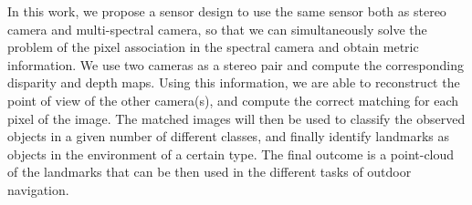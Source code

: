\documentclass[letterpaper, 10pt, conference]{ieeeconf}      %
\begin{document}
%
%
%



In this work, we propose a sensor design to use the same sensor both as stereo camera and multi-spectral camera, so that we can simultaneously solve the problem of the pixel association in the spectral camera and obtain metric information.
We use two cameras as a stereo pair and compute the corresponding disparity and depth maps.
Using this information, we are able to reconstruct the point of view of the other camera(s), and compute the correct matching for each pixel of the image.
The matched images will then be used to classify the observed objects in a given number of different classes, and finally identify landmarks as objects in the environment of a certain type.
The final outcome is a point-cloud of the landmarks that can be then used in the different tasks of outdoor navigation.
\end{document}
